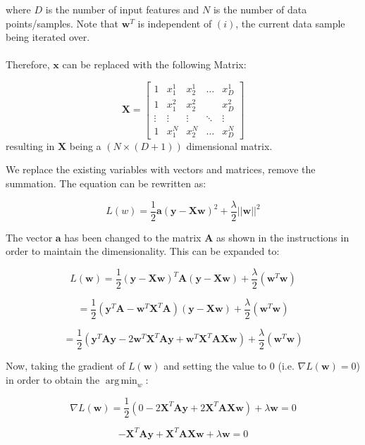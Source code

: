 \documentclass[10pt]{article}
\begin{document}
where $D$ is the number of input features and $N$ is the number of data points/samples. Note that $\textbf{w}^T$ is independent of $(i)$, the current data sample being iterated over. 
\\ \\
Therefore, $\textbf{x}$  can be replaced with the following Matrix:

\[\textbf{X} = 
\begin{bmatrix} 
1 &  x_{1}^{1} & x_{2}^{1} & \hdots & x_{D}^{1}
\\ 1 &  x_{1}^{2} & x_{2}^{2} & & x_{D}^{2}
\\ \vdots & \vdots & \vdots & \ddots & \vdots
\\ 1 & x_{1}^{N} & x_{2}^{N} & \hdots & x_{D}^{N}
 \end{bmatrix}
\]
resulting in $\textbf{X}$ being a $(N \times (D+1))$ dimensional matrix.

We replace the existing variables with vectors and matrices, remove the summation. The equation can be rewritten as: 

\[L(w) = 
\frac{1}{2} 
\textbf{a}
(\textbf{y} - \textbf{X}\textbf{w})^2
+
\frac{\lambda}{2}
||\textbf{w}||^2
\]

The vector $\textbf{a}$ has been changed to the matrix $\textbf{A}$ as shown in the instructions  in order to maintain the dimensionality.
This can be expanded to: 

\[L(\textbf{w}) = 
\frac{1}{2} 
(\textbf{y} - \textbf{X}\textbf{w})^T
\textbf{A}
(\textbf{y} - \textbf{X}\textbf{w})
+
\frac{\lambda}{2}
(\textbf{w}^T\textbf{w})
\]

\[ = 
\frac{1}{2} 
(\textbf{y}^T\textbf{A} 
- \textbf{w}^T\textbf{X}^T\textbf{A})
(\textbf{y} - \textbf{X}\textbf{w})
+
\frac{\lambda}{2}
(\textbf{w}^T\textbf{w})
\]

\[ = 
\frac{1}{2} 
(\textbf{y}^T\textbf{A}\textbf{y}
- 2\textbf{w}^T\textbf{X}^T\textbf{A}\textbf{y}
+ \textbf{w}^T\textbf{X}^T\textbf{A}\textbf{X}\textbf{w}
)
+
\frac{\lambda}{2}
(\textbf{w}^T\textbf{w})
\]

Now, taking the gradient of $L(\textbf{w})$ and setting the value to 0 (i.e. $\nabla L(\textbf{w}) = 0$) in order to obtain the $\operatorname{arg\,min}_w$: 

\[
\nabla L(\textbf{w}) = 
\frac{1}{2} 
(
0
- 2\textbf{X}^T\textbf{A}\textbf{y}
+ 2 \textbf{X}^T\textbf{A}\textbf{X}\textbf{w}
)
+
\lambda\textbf{w}
= 0
\]

\[
- \textbf{X}^T\textbf{A}\textbf{y}
+ \textbf{X}^T\textbf{A}\textbf{X}\textbf{w}
+
\lambda\textbf{w}
= 0
\]
\end{document}

